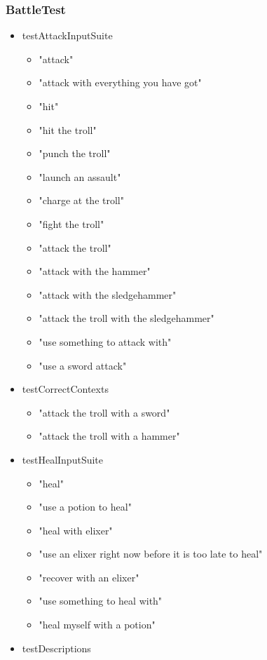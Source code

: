\documentclass[11pt]{article}
\begin{document}
\subsubsection{BattleTest}
\begin{scriptsize}
\begin{itemize}
\item testAttackInputSuite
	\begin{itemize}
	\item "attack"
	\item "attack with everything you have got"
	\item "hit"
	\item "hit the troll"
	\item "punch the troll"
	\item "launch an assault"
	\item "charge at the troll"
	\item "fight the troll"
	\item "attack the troll"
	\item "attack with the hammer"
	\item "attack with the sledgehammer"
	\item "attack the troll with the sledgehammer"
	\item "use something to attack with"
	\item "use a sword attack"
	\end{itemize}
\item testCorrectContexts
	\begin{itemize}
	\item "attack the troll with a sword"
	\item "attack the troll with a hammer"
	\end{itemize}
\item testHealInputSuite
	\begin{itemize}
	\item "heal"
	\item "use a potion to heal"
	\item "heal with elixer"
	\item "use an elixer right now before it is too late to heal"
	\item "recover with an elixer"
	\item "use something to heal with"
	\item "heal myself with a potion"
	\end{itemize}
\item testDescriptions
	\begin{itemize}

\end{itemize}
\end{itemize}
\end{scriptsize}
\end{document}
